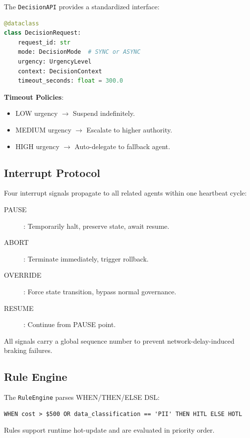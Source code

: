 \documentclass[11pt,a4paper]{article}
\begin{document}
The \texttt{DecisionAPI} provides a standardized interface:

\begin{lstlisting}[language=Python, caption=Decision Request Schema]
@dataclass
class DecisionRequest:
    request_id: str
    mode: DecisionMode  # SYNC or ASYNC
    urgency: UrgencyLevel
    context: DecisionContext
    timeout_seconds: float = 300.0
\end{lstlisting}

\textbf{Timeout Policies}:
\begin{itemize}
  \item LOW urgency $\rightarrow$ Suspend indefinitely.
  \item MEDIUM urgency $\rightarrow$ Escalate to higher authority.
  \item HIGH urgency $\rightarrow$ Auto-delegate to fallback agent.
\end{itemize}

\subsection{Interrupt Protocol}

Four interrupt signals propagate to all related agents within one heartbeat cycle:

\begin{description}
  \item[PAUSE]: Temporarily halt, preserve state, await resume.
  \item[ABORT]: Terminate immediately, trigger rollback.
  \item[OVERRIDE]: Force state transition, bypass normal governance.
  \item[RESUME]: Continue from PAUSE point.
\end{description}

All signals carry a global sequence number to prevent network-delay-induced braking failures.

\subsection{Rule Engine}

The \texttt{RuleEngine} parses WHEN/THEN/ELSE DSL:

\begin{verbatim}
WHEN cost > $500 OR data_classification == 'PII' THEN HITL ELSE HOTL
\end{verbatim}

Rules support runtime hot-update and are evaluated in priority order.
\end{document}
